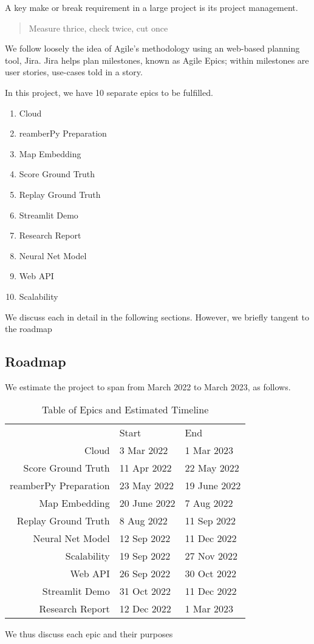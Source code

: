 A key make or break requirement in a large project is its project management.

\begin{quote}
    Measure thrice, check twice, cut once
\end{quote}

We follow loosely the idea of Agile's methodology using an web-based planning tool, Jira.
Jira helps plan milestones, known as Agile Epics;
within milestones are user stories, use-cases told in a story.

In this project, we have 10 separate epics to be fulfilled.

\begin{enumerate}
    \item Cloud
    \item reamberPy Preparation
    \item Map Embedding
    \item Score Ground Truth
    \item Replay Ground Truth
    \item Streamlit Demo
    \item Research Report
    \item Neural Net Model
    \item Web API
    \item Scalability
\end{enumerate}

We discuss each in detail in the following sections.
However, we briefly tangent to the roadmap

\subsection{Roadmap}\label{subsec:roadmap}

We estimate the project to span from March 2022 to March 2023, as follows.

\begin{table}[H]
    \begin{tabular}{r|ll}
        & Start        & End          \\
        Cloud                 & 3 Mar 2022   & 1 Mar 2023   \\
        Score Ground Truth    & 11 Apr 2022  & 22 May 2022  \\
        reamberPy Preparation & 23 May 2022  & 19 June 2022 \\
        Map Embedding         & 20 June 2022 & 7 Aug 2022   \\
        Replay Ground Truth   & 8 Aug 2022   & 11 Sep 2022  \\
        Neural Net Model      & 12 Sep 2022  & 11 Dec 2022  \\
        Scalability           & 19 Sep 2022  & 27 Nov 2022  \\
        Web API               & 26 Sep 2022  & 30 Oct 2022  \\
        Streamlit Demo        & 31 Oct 2022  & 11 Dec 2022  \\
        Research Report       & 12 Dec 2022  & 1 Mar 2023
    \end{tabular}
    \caption{Table of Epics and Estimated Timeline}
    \label{tab:epics}
\end{table}

We thus discuss each epic and their purposes

